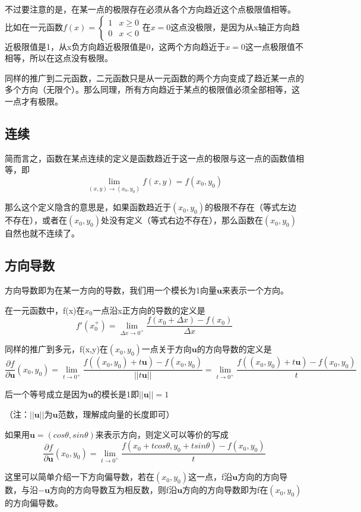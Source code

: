 \documentclass{article}
\begin{document}
不过要注意的是，在某一点的极限存在必须从各个方向趋近这个点极限值相等。
比如在一元函数$f(x) = \begin{cases}1 & x  \geq  0\\0 & x < 0\end{cases}$在$x=0$这点没极限，是因为从x轴正方向趋近极限值是1，从x负方向趋近极限值是0，这两个方向趋近于$x=0$这一点极限值不相等，所以在这点没有极限。

同样的推广到二元函数，二元函数只是从一元函数的两个方向变成了趋近某一点的多个方向（无限个）。那么同理，所有方向趋近于某点的极限值必须全部相等，这一点才有极限。

\subsection{连续}
简而言之，函数在某点连续的定义是函数趋近于这一点的极限与这一点的函数值相等，即
\[\lim\limits_{(x,y) \rightarrow (x_0,y_0)} f(x,y)=f(x_0,y_0)\]

那么这个定义隐含的意思是，如果函数趋近于$(x_0,y_0)$的极限不存在（等式左边不存在），或者在$(x_0,y_0)$处没有定义（等式右边不存在），那么函数在$(x_0,y_0)$自然也就不连续了。

\subsection{方向导数}
方向导数即为在某一方向的导数，我们用一个模长为1向量$\mathbf{u}$来表示一个方向。

在一元函数中，f(x)在$x_0$一点沿x正方向的导数的定义是
\[f'(x_0^+) = \lim\limits_{\Delta x \rightarrow 0^+} \frac{f(x_0+\Delta x)-f(x_0)}{\Delta x}   \]

同样的推广到多元，f(x,y)在$(x_0,y_0)$一点关于方向$\mathbf{u}$的方向导数的定义是
\[\frac{\partial f}{\partial \mathbf{u}}(x_0,y_0)  = \lim\limits_{t \rightarrow 0^+} \frac{f((x_0,y_0)+t\mathbf{u})-f(x_0,y_0)}{||t\mathbf{u}||}  =\lim\limits_{t \rightarrow 0^+} \frac{f((x_0,y_0)+t\mathbf{u})-f(x_0,y_0)}{t} \]

后一个等号成立是因为$\mathbf{u}$的模长是1即$||\mathbf{u}||=1$

（注：$||\mathbf{u}||$为$\mathbf{u}$范数，理解成向量的长度即可）

如果用$\mathbf{u}=(cos\theta,sin\theta)$来表示方向，则定义可以等价的写成
\[\frac{\partial f}{\partial \mathbf{u}}(x_0,y_0) =\lim\limits_{t \rightarrow 0^+} \frac{f(x_0+tcos\theta,y_0+tsin\theta)-f(x_0,y_0)}{t}\]

这里可以简单介绍一下方向偏导数，若在$(x_0,y_0)$这一点，f沿$\mathbf{u}$方向的方向导数，与沿$-\mathbf{u}$方向的方向导数互为相反数，则f沿$\mathbf{u}$方向的方向导数即为f在$(x_0,y_0)$的方向偏导数。
\end{document}
